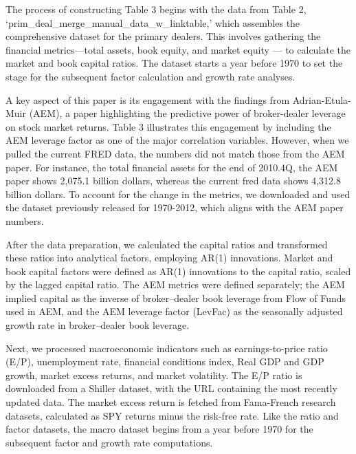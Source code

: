 \documentclass{article}
\begin{document}
The process of constructing Table 3 begins with the data from Table 2, `prim\_deal\_merge\_manual\_data\_w\_linktable,' which assembles the comprehensive dataset for the primary dealers. This involves gathering the financial metrics—total assets, book equity, and market equity — to calculate the market and book capital ratios.  The dataset starts a year before 1970 to set the stage for the subsequent factor calculation and growth rate analyses.

A key aspect of this paper is its engagement with the findings from Adrian-Etula-Muir (AEM), a paper highlighting the predictive power of broker-dealer leverage on stock market returns. Table 3 illustrates this engagement by including the AEM leverage factor as one of the major correlation variables. However, when we pulled the current FRED data, the numbers did not match those from the AEM paper. For instance, the total financial assets for the end of 2010.4Q, the AEM paper shows 2,075.1 billion dollars, whereas the current fred data shows 4,312.8 billion dollars. To account for the change in the metrics, we downloaded and used the dataset previously released for 1970-2012, which aligns with the AEM paper numbers.

After the data preparation, we calculated the capital ratios and transformed these ratios into analytical factors, employing AR(1) innovations. Market and book capital factors were defined as AR(1) innovations to the capital ratio, scaled by the lagged capital ratio. The AEM metrics were defined separately; the AEM implied capital as the inverse of broker–dealer book leverage from Flow of Funds used in AEM, and the AEM leverage factor (LevFac) as the seasonally adjusted growth rate in broker–dealer book leverage.

Next, we processed macroeconomic indicators such as earnings-to-price ratio (E/P), unemployment rate, financial conditions index, Real GDP and GDP growth, market excess returns, and market volatility. The E/P ratio is downloaded from a Shiller dataset, with the URL containing the most recently updated data. The market excess return is fetched from Fama-French research datasets, calculated as SPY returns minus the risk-free rate. Like the ratio and factor datasets, the macro dataset begins from a year before 1970 for the subsequent factor and growth rate computations.
\end{document}
